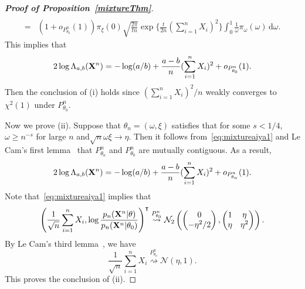 \documentclass[11pt]{article}
\newcommand{\myT}{\intercal}
\theoremstyle{plain}
\theoremstyle{definition}
\theoremstyle{remark}
\begin{document}
\begin{appendices}
\begin{proof}[\textbf{Proof of Proposition~\ref{mixtureThm}}]
\begin{align*}
    \\
    =&
    (1+o_{P^n_{\theta_0}}(1))\pi_{\xi}(0)\sqrt{\frac{2\pi}{tn}}\exp \Big\{ \frac{t}{2n}(\sum_{i=1}^n X_i)^2\Big\} 
\int_{0}^1 
\frac{1}{\omega}
\pi_{\omega}(\omega)\, \mathrm d\omega.
\end{align*}
This implies that
\begin{equation*}
    2\log \Lambda_{a,b} (\mathbf{X}^n)=-\log(a/b)+\frac{a-b}{n}(\sum_{i=1}^n X_i)^2+o_{P^n_{\theta_0}}(1).
\end{equation*}
Then the conclusion of (i) holds since $(\sum_{i=1}^n X_i)^2/n$ weakly converges to $ \chi^2(1)$ under $P^n_{\theta_0}$.

Now we prove (ii). Suppose that $\theta_n=(\omega,\xi)$ satisfies that for some $s<1/4$, $\omega\geq n^{-s}$ for large $n$ and$\sqrt{n}\omega \xi \to \eta$.
Then it follows from~\eqref{eq:mixtureaiya1} and Le Cam's first lemma~\citep[Theorem 6.4]{van2000asymptotic} that
$P^n_{\theta_n}$ and $P^n_{\theta_0}$ are mutually contiguous.
As a result,
\begin{equation*}
    2\log \Lambda_{a,b} (\mathbf{X}^n) = -\log(a/b)+\frac{a-b}{n}(\sum_{i=1}^n X_i)^2+o_{P^n_{\theta_n}}(1).
\end{equation*}
Note that~\eqref{eq:mixtureaiya1} implies that
\begin{equation*}
    \left(\frac{1}{\sqrt n}\sum_{i=1}^n X_i,\log \frac{p_n(\BX^{n}|\theta)}{p_n(\BX^{n}|\theta_0)}\right)^\myT 
        \overset{P^n_{\theta_0}}{\rightsquigarrow}
        \mathcal{N}_2\left(
    \begin{pmatrix}
        0\\
        -{\eta^2}/{2}
    \end{pmatrix}
    ,
    \begin{pmatrix}
        1 & \eta\\
        \eta & \eta^2
    \end{pmatrix}
\right).
\end{equation*}
By Le Cam's third lemma~\citep[Example 6.7]{van2000asymptotic}, we have
\begin{equation*}
    \frac{1}{\sqrt n}\sum_{i=1}^n X_i
    \overset{P^n_{\theta_n}}{\rightsquigarrow} \mathcal{N}(\eta,1).
\end{equation*}
This proves the conclusion of (ii).

\end{proof}



\end{appendices}
\end{document}

